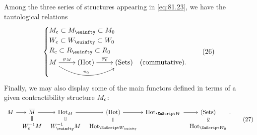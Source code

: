 Among the three series of structures appearing in \eqref{eq:81.23}, we
have the tautological relations
\begin{equation}
  \label{eq:81.26}
  \begin{cases}
    M\subc \subset M_\oo \subset M_0 & \\
    W\subc \subset W_\oo \subset W_0 & \\
    R\subc \subset R_\oo \subset R_0 & \\
    \begin{tikzcd}[cramped]
      M \ar[r,"\varphi_M"] \ar[rr,bend right, "\pi_0"] &
      \Hot \ar[r,"\overline{\piz}"] & \Sets
    \end{tikzcd} & \text{(commutative).}
  \end{cases}\tag{26}
\end{equation}
Finally, we may also display some of the main functors defined in
terms of a given contractibility structure $M_{\mathrm{c}}$:
\begin{equation}
  \label{eq:81.27}
  \begin{tabular}{@{}c@{}}
  \begin{tikzcd}[baseline=(O.base),sep=tiny]
    |[alias=O]| M\ar[r] &
    \overline M \ar[r]\ar[d,equal] &
    \HotOf_M \ar[r]\ar[d,equal] &
    \Hot \ar[r]\ar[d,equal] &
    \HotOf_\scrW \ar[r] &
    \Sets\ar[d,phantom,sloped,"\equ" description] \\
    & W\subc^{-1}M & W_\oo^{-1}M & \HotOf_\scrWoo & & \HotOf_\scrWz
  \end{tikzcd}.
  \end{tabular}\tag{27}
\end{equation}

\bigbreak

\presectionfill{}\par

